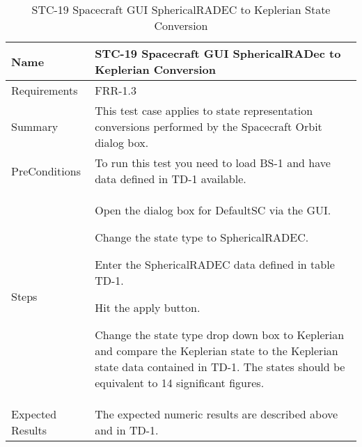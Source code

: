 \begin{table}[htbp!]
\centering
      \begin{tabular}{|p{1.05 in} |p{4.75 in} |}
      \hline
         \rowcolor[rgb]{0.8,0.8,0.8} Name & STC-19 Spacecraft GUI SphericalRADec to Keplerian Conversion\\
         \hline
         Requirements & FRR-1.3\\ \hline
         Summary &
         This test case applies to state representation conversions performed by the Spacecraft Orbit dialog box.  \\
         \hline
         PreConditions & To run this test you need to load BS-1 and have data defined in TD-1 available.\\
         \hline
         Steps &
         \begin{compactenum}
         \item Open the dialog box for DefaultSC via the GUI.
         \item Change the state type to SphericalRADEC.
         \item Enter the SphericalRADEC data defined in table TD-1.
         \item Hit the apply button.
         \item Change the state type drop down box to Keplerian and compare the Keplerian state to the
         Keplerian state data contained in TD-1. The states should be equivalent to 14 significant figures.
         \end{compactenum}\\
         \hline
         Expected Results & The expected numeric results are described above and in TD-1.\\
      \hline
\end{tabular}
      \label{Table: STC-19}
      \caption{STC-19 Spacecraft GUI SphericalRADEC to Keplerian State Conversion}
\end{table} 